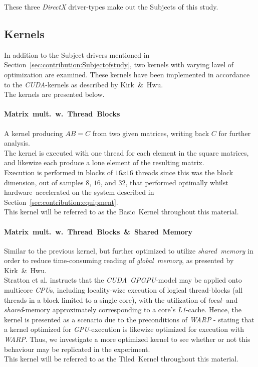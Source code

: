 \documentclass[fleqn,10pt]{SelfArx} %
\begin{document}
\noindent
These three \textit{DirectX} driver-types make out the Subjects of this study.

\subsection{Kernels}
\label{sec:contribution:kernels}
In addition to the Subject drivers mentioned in Section~\ref{sec:contribution:Subjectofstudy}, two kernels with varying lavel of optimization are examined. These kernels have been implemented in accordance to the \textit{CUDA}-kernels as described by Kirk~\&~Hwu\cite[p.~67, p.~87]{Kirk:2010:PMP:1841511}.\\
The kernels are presented below.
\paragraph{Matrix~mult.~w.~Thread~Blocks}
	A kernel producing $AB=C$ from two given matrices, writing back $C$ for further analysis.\\
	The kernel is executed with one thread for each element in the square matrices, and likewize each produce a lone element of the resulting matrix.\\
	Execution is performed in blocks of $16x16$ threads since this was the block dimension, out of samples $8$, $16$, and $32$, that performed optimally whilst hardware~accelerated on the system described in Section~\ref{sec:contribution:equipment}.  \\
	This kernel will be referred to as the Basic~Kernel throughout this material.
\paragraph{Matrix~mult.~w.~Thread~Blocks~\&~Shared~Memory}
	Similar to the previous kernel, but further optimized to utilize \textit{shared~memory} in order to reduce time-consuming reading of \textit{global~memory}, as presented by Kirk~\&~Hwu\cite[p.~77-93]{Kirk:2010:PMP:1841511}.\\
		Stratton et al.\cite[p.~1-3]{Stratton:2008:MEI:1485701.1485703} instructs that the \textit{CUDA}~\textit{GPGPU}-model may be applied onto multicore \textit{CPU}s, including locality-wize execution of logical thread-blocks (all threads in a block limited to a single core), with the utilization of \textit{local}- and \textit{shared}-memory approximately corresponding to a core's \textit{L1}-cache. Hence, the kernel is presented as a scenario due to the preconditions of \textit{WARP} - stating that a kernel optimized for \textit{GPU}-execution is likewize optimized for execution with \textit{WARP}. Thus, we investigate a more optimized kernel to see whether or not this behaviour may be replicated in the experiment.\\
	This kernel will be referred to as the Tiled~Kernel throughout this material.\\
\end{document}
